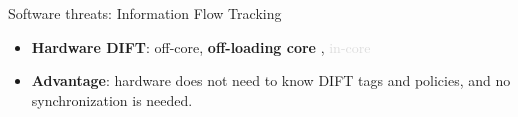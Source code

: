 \begin{frame}{Software threats: Information Flow Tracking}
    \begin{minipage}[c]{0.45\textwidth}
        \begin{block}{}
            \begin{itemize}
                [square]
                \justifying
                    \item \textbf{Hardware DIFT}: off-core, \textbf{off-loading core} \cite{CKSFGMRRRV-08-sigarch}, \textcolor{Gainsboro}{in-core}
            \end{itemize}
        \end{block}
        \begin{exampleblock}{}
            \begin{itemize}
                [square]
                \justifying
                \item \textbf{Advantage}: hardware does not need to know DIFT tags and policies, and no synchronization is needed.
            \end{itemize}
        \end{exampleblock}
        

\end{minipage}
\end{frame}
